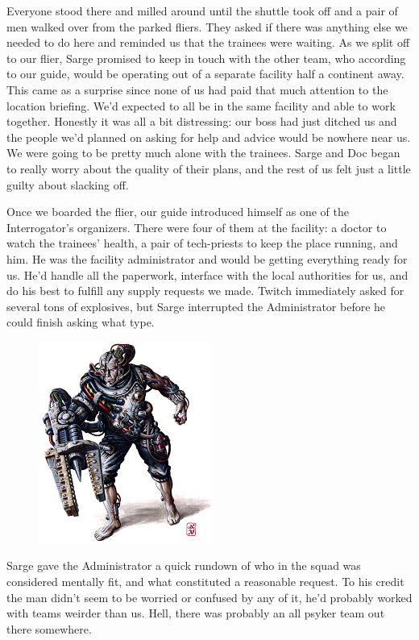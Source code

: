 Everyone stood there and milled around until the shuttle took off and a pair of men walked over from the parked fliers. 
They asked if there was anything else we needed to do here and reminded us that the trainees were waiting. 
As we split off to our flier, Sarge promised to keep in touch with the other team, who according to our guide, would be operating out of a separate facility half a continent away. 
This came as a surprise since none of us had paid that much attention to the location briefing. 
We’d expected to all be in the same facility and able to work together. 
Honestly it was all a bit distressing: 
our boss had just ditched us and the people we’d planned on asking for help and advice would be nowhere near us. 
We were going to be pretty much alone with the trainees. 
Sarge and Doc began to really worry about the quality of their plans, and the rest of us felt just a little guilty about slacking off.

Once we boarded the flier, our guide introduced himself as one of the Interrogator’s organizers. 
There were four of them at the facility: 
a doctor to watch the trainees’ health, a pair of tech-priests to keep the place running, and him. 
He was the facility administrator and would be getting everything ready for us. 
He’d handle all the paperwork, interface with the local authorities for us, and do his best to fulfill any supply requests we made. 
Twitch immediately asked for several tons of explosives, but Sarge interrupted the Administrator before he could finish asking what type.

\begin{figure}
	\begin{center}
		\includegraphics[width=\figwidth]{pics/8/8.png}
	\end{center}
\end{figure}
Sarge gave the Administrator a quick rundown of who in the squad was considered mentally fit, and what constituted a reasonable request. 
To his credit the man didn’t seem to be worried or confused by any of it, he’d probably worked with teams weirder than us. 
Hell, there was probably an all psyker team out there somewhere.

